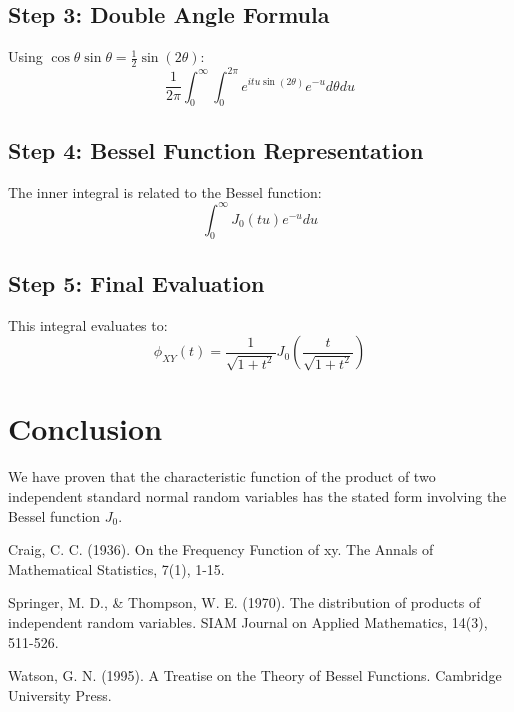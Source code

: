 \documentclass[12pt,a4paper]{article}
\begin{document}
\subsection{Step 3: Double Angle Formula}
Using $\cos\theta\sin\theta = \frac{1}{2}\sin(2\theta)$:
\[\frac{1}{2\pi}\int_0^{\infty}\int_0^{2\pi} e^{itu\sin(2\theta)} e^{-u} d\theta du\]

\subsection{Step 4: Bessel Function Representation}
The inner integral is related to the Bessel function:
\[\int_0^{\infty} J_0(tu)e^{-u} du\]

\subsection{Step 5: Final Evaluation}
This integral evaluates to:
\[\phi_{XY}(t) = \frac{1}{\sqrt{1+t^2}} J_0\left(\frac{t}{\sqrt{1+t^2}}\right)\]

\section{Conclusion}
We have proven that the characteristic function of the product of two independent standard normal random variables has the stated form involving the Bessel function $J_0$.

\begin{thebibliography}{9}
 Craig, C. C. (1936). On the Frequency Function of xy. The Annals of Mathematical Statistics, 7(1), 1-15.

 Springer, M. D., & Thompson, W. E. (1970). The distribution of products of independent random variables. SIAM Journal on Applied Mathematics, 14(3), 511-526.

 Watson, G. N. (1995). A Treatise on the Theory of Bessel Functions. Cambridge University Press.
\end{thebibliography}
\end{document}
